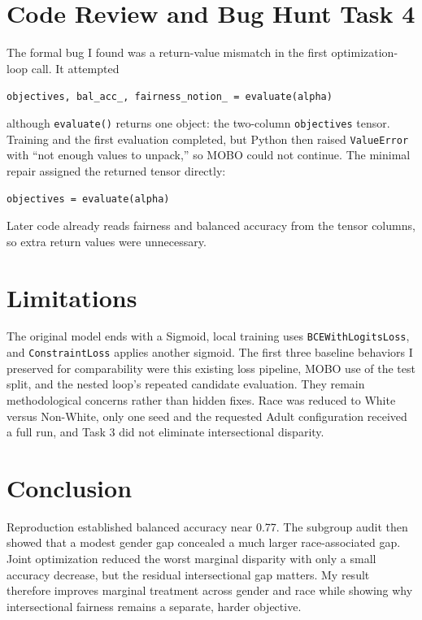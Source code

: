 \documentclass[10pt,a4paper]{article}
\newcommand{\tasktag}[1]{\textcolor{accent}{\textbf{Task #1}}}
\begin{document}
\section*{Code Review and Bug Hunt \hfill \tasktag{4}}

The formal bug I found was a return-value mismatch in the first optimization-loop call. It attempted
\begin{center}
\texttt{objectives, bal\_acc\_, fairness\_notion\_ = evaluate(alpha)}
\end{center}
although \texttt{evaluate()} returns one object: the two-column \texttt{objectives} tensor. Training and the first evaluation completed, but Python then raised \texttt{ValueError} with ``not enough values to unpack,'' so MOBO could not continue. The minimal repair assigned the returned tensor directly:
\begin{center}
\texttt{objectives = evaluate(alpha)}
\end{center}
Later code already reads fairness and balanced accuracy from the tensor columns, so extra return values were unnecessary.

\section*{Limitations}

The original model ends with a Sigmoid, local training uses \texttt{BCEWithLogitsLoss}, and \texttt{ConstraintLoss} applies another sigmoid. The first three baseline behaviors I preserved for comparability were this existing loss pipeline, MOBO use of the test split, and the nested loop's repeated candidate evaluation. They remain methodological concerns rather than hidden fixes. Race was reduced to White versus Non-White, only one seed and the requested Adult configuration received a full run, and Task 3 did not eliminate intersectional disparity.

\section*{Conclusion}

Reproduction established balanced accuracy near 0.77. The subgroup audit then showed that a modest gender gap concealed a much larger race-associated gap. Joint optimization reduced the worst marginal disparity with only a small accuracy decrease, but the residual intersectional gap matters. My result therefore improves marginal treatment across gender and race while showing why intersectional fairness remains a separate, harder objective.

\clearpage
\begingroup
\footnotesize


\endgroup
\end{document}
